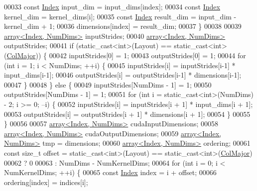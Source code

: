 \begin{DoxyCode}
00033       \textcolor{keyword}{const} \hyperlink{namespace_eigen_a62e77e0933482dafde8fe197d9a2cfde}{Index} input\_dim = input\_dims[index];
00034       \textcolor{keyword}{const} \hyperlink{namespace_eigen_a62e77e0933482dafde8fe197d9a2cfde}{Index} kernel\_dim = kernel\_dims[i];
00035       \textcolor{keyword}{const} \hyperlink{namespace_eigen_a62e77e0933482dafde8fe197d9a2cfde}{Index} result\_dim = input\_dim - kernel\_dim + 1;
00036       dimensions[index] = result\_dim;
00037     \}
00038 
00039     \hyperlink{class_eigen_1_1array}{array<Index, NumDims>} inputStrides;
00040     \hyperlink{class_eigen_1_1array}{array<Index, NumDims>} outputStrides;
00041     \textcolor{keywordflow}{if} (static\_cast<int>(Layout) == static\_cast<int>(\hyperlink{group__enums_ggaacded1a18ae58b0f554751f6cdf9eb13a0cbd4bdd0abcfc0224c5fcb5e4f6669a}{ColMajor})) \{
00042       inputStrides[0] = 1;
00043       outputStrides[0] = 1;
00044       \textcolor{keywordflow}{for} (\textcolor{keywordtype}{int} i = 1; i < NumDims; ++i) \{
00045         inputStrides[i] = inputStrides[i-1] * input\_dims[i-1];
00046         outputStrides[i] = outputStrides[i-1] * dimensions[i-1];
00047       \}
00048     \} \textcolor{keywordflow}{else} \{
00049       inputStrides[NumDims - 1] = 1;
00050       outputStrides[NumDims - 1] = 1;
00051       \textcolor{keywordflow}{for} (\textcolor{keywordtype}{int} i = static\_cast<int>(NumDims) - 2; i >= 0; --i) \{
00052         inputStrides[i] = inputStrides[i + 1] * input\_dims[i + 1];
00053         outputStrides[i] = outputStrides[i + 1] * dimensions[i + 1];
00054       \}
00055     \}
00056 
00057     \hyperlink{class_eigen_1_1array}{array<Index, NumDims>} cudaInputDimensions;
00058     \hyperlink{class_eigen_1_1array}{array<Index, NumDims>} cudaOutputDimensions;
00059     \hyperlink{class_eigen_1_1array}{array<Index, NumDims>} tmp = dimensions;
00060     \hyperlink{class_eigen_1_1array}{array<Index, NumDims>} ordering;
00061     \textcolor{keyword}{const} \textcolor{keywordtype}{size\_t} offset = \textcolor{keyword}{static\_cast<}\textcolor{keywordtype}{int}\textcolor{keyword}{>}(Layout) == static\_cast<int>(\hyperlink{group__enums_ggaacded1a18ae58b0f554751f6cdf9eb13a0cbd4bdd0abcfc0224c5fcb5e4f6669a}{ColMajor})
00062                               ? 0
00063                               : NumDims - NumKernelDims;
00064     \textcolor{keywordflow}{for} (\textcolor{keywordtype}{int} i = 0; i < NumKernelDims; ++i) \{
00065       \textcolor{keyword}{const} \hyperlink{namespace_eigen_a62e77e0933482dafde8fe197d9a2cfde}{Index} index = i + offset;
00066       ordering[index] = indices[i];

\end{DoxyCode}
